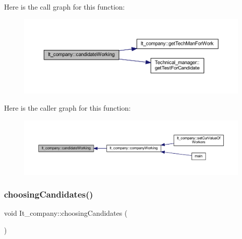 Here is the call graph for this function\+:
\nopagebreak
\begin{figure}[H]
\begin{center}
\leavevmode
\includegraphics[width=350pt]{class_it__company_aaca00d2170e5b58ec725a35afb0f4b59_cgraph}
\end{center}
\end{figure}
Here is the caller graph for this function\+:
\nopagebreak
\begin{figure}[H]
\begin{center}
\leavevmode
\includegraphics[width=350pt]{class_it__company_aaca00d2170e5b58ec725a35afb0f4b59_icgraph}
\end{center}
\end{figure}
\hypertarget{class_it__company_aead10e44d7215787e8e532e2e0463d0d}{}\label{class_it__company_aead10e44d7215787e8e532e2e0463d0d} 
\subsubsection{\texorpdfstring{choosing\+Candidates()}{choosingCandidates()}}
{\footnotesize\ttfamily void It\+\_\+company\+::choosing\+Candidates (\begin{DoxyParamCaption}{ }\end{DoxyParamCaption})\hspace{0.3cm}{\ttfamily [private]}}

